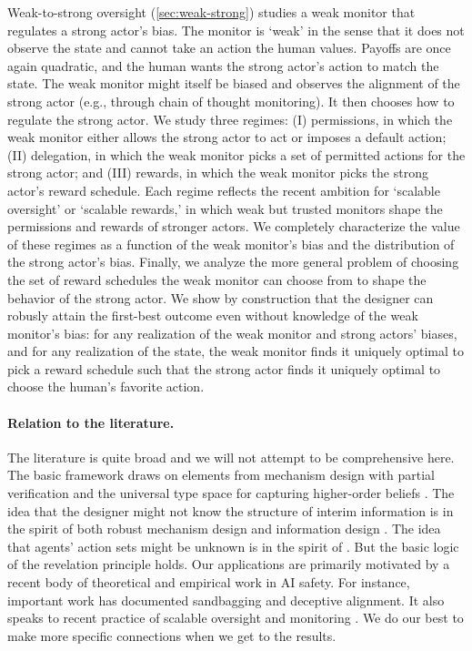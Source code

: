 \documentclass[12pt,reqno]{article}
\theoremstyle{definition} \newtheorem{example}{Example}
\theoremstyle{definition} \newtheorem{condition}{Condition}
\theoremstyle{definition} \newtheorem{corollary}{Corollary}
\theoremstyle{definition} \newtheorem{claim}{Claim}
\theoremstyle{definition} \newtheorem{definition}{Definition}
\theoremstyle{definition} \newtheorem{conjecture}{Conjecture}
\theoremstyle{definition} \newtheorem{Lemma}{Lemma}
\theoremstyle{definition} \newtheorem{lemma}{Lemma}
\theoremstyle{plain} \newtheorem{theorem}{Theorem}
\theoremstyle{definition} \newtheorem{assumption}{Assumption}
\theoremstyle{definition} \newtheorem*{assumptionnonumber}{Assumption}
\theoremstyle{definition} \newtheorem*{theoremNoNumber}{Proposition}
\theoremstyle{definition}\newtheorem{proposition}{Proposition}
\theoremstyle{definition} \newtheorem{observation}{Observation}
\theoremstyle{definition} \newtheorem*{definitionNoNumber}{Definition}
\theoremstyle{definition} \newtheorem{Definition}{Definition}
\theoremstyle{definition} \newtheorem*{DefinitionNoNumber}{Definition}
\theoremstyle{definition} \newtheorem*{fact}{Fact}
\theoremstyle{definition} \newtheorem*{property}{Property}
\theoremstyle{definition} \newtheorem{remark}{Remark}
\theoremstyle{definition}\newtheorem{romanexampleinner}{Example}
\begin{document}
Weak-to-strong oversight (\cref{sec:weak-strong}) studies a weak monitor that regulates a strong actor's bias. The monitor is `weak' in the sense that it does not observe the state and cannot take an action the human values. Payoffs are once again quadratic, and the human wants the strong actor's action to match the state. The weak monitor might itself be biased and observes the alignment of the strong actor (e.g., through chain of thought monitoring). It then chooses how to regulate the strong actor. We study three regimes: (I) permissions, in which the weak monitor either allows the strong actor to act or imposes a default action; (II) delegation, in which the weak monitor picks a set of permitted actions for the strong actor; and (III) rewards, in which the weak monitor picks the strong actor's reward schedule. Each regime reflects the recent ambition for `scalable oversight' or `scalable rewards,' in which weak but trusted monitors shape the permissions and rewards of stronger actors. We completely characterize the value of these regimes as a function of the weak monitor's bias and the distribution of the strong actor's bias. Finally, we analyze the more general problem of choosing the set of reward schedules the weak monitor can choose from to shape the behavior of the strong actor. We show by construction that the designer can robusly attain the first-best outcome even without knowledge of the weak monitor's bias: for any realization of the weak monitor and strong actors' biases, and for any realization of the state, the weak monitor finds it uniquely optimal to pick a reward schedule such that the strong actor finds it uniquely optimal to choose the human's favorite action. 

\paragraph{Relation to the literature.} The literature is quite broad and we will not attempt to be comprehensive here. The basic framework draws on elements from mechanism design with partial verification \citep{green1986partially} and the universal type space for capturing higher-order beliefs \citep{mertens1985formulation}. The idea that the designer might not know the structure of interim information is in the spirit of both robust mechanism design \citep{bergemann2005robust} and information design \citep{bergemann2019information}. The idea that agents' action sets might be unknown is in the spirit of \citep{hurwicz1978incentive,carroll2015robustness}. But the basic logic of the revelation principle \citep{myerson1982optimal,forges1986approach} holds. Our applications are primarily motivated by a recent body of theoretical and empirical work in AI safety. For instance, important work has documented sandbagging and deceptive alignment. It also speaks to recent practice of scalable oversight and monitoring \citep{christiano2018supervising,greenblatt2024control}. We do our best to make more specific connections when we get to the results.  
\end{document}
